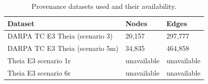 \begin{table}[t]
\centering
\small
\caption{Provenance datasets used and their availability.}
\label{tab:datasets}
\begin{tabular}{lll}
\toprule
Dataset & Nodes & Edges \\
\midrule
DARPA TC E3 Theia (scenario 3) & 20,157 & 297,777 \\
DARPA TC E3 Theia (scenario 5m) & 34,835 & 464,858 \\
Theia E3 scenario 1r & unavailable & unavailable \\
Theia E3 scenario 6r & unavailable & unavailable \\
\bottomrule
\end{tabular}
\end{table}
